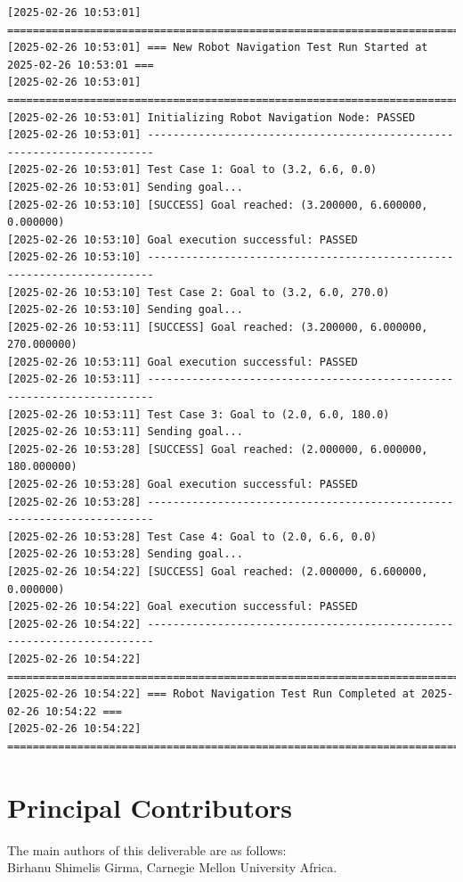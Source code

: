 \documentclass{CSSRforAfrica}
\newcommand{\blank}{~\\}
\begin{document}
\begin{landscape}
\begin{verbatim}
[2025-02-26 10:53:01] =======================================================================
[2025-02-26 10:53:01] === New Robot Navigation Test Run Started at 2025-02-26 10:53:01 ===
[2025-02-26 10:53:01] =======================================================================
[2025-02-26 10:53:01] Initializing Robot Navigation Node: PASSED
[2025-02-26 10:53:01] -----------------------------------------------------------------------
[2025-02-26 10:53:01] Test Case 1: Goal to (3.2, 6.6, 0.0)
[2025-02-26 10:53:01] Sending goal...
[2025-02-26 10:53:10] [SUCCESS] Goal reached: (3.200000, 6.600000, 0.000000)
[2025-02-26 10:53:10] Goal execution successful: PASSED
[2025-02-26 10:53:10] -----------------------------------------------------------------------
[2025-02-26 10:53:10] Test Case 2: Goal to (3.2, 6.0, 270.0)
[2025-02-26 10:53:10] Sending goal...
[2025-02-26 10:53:11] [SUCCESS] Goal reached: (3.200000, 6.000000, 270.000000)
[2025-02-26 10:53:11] Goal execution successful: PASSED
[2025-02-26 10:53:11] -----------------------------------------------------------------------
[2025-02-26 10:53:11] Test Case 3: Goal to (2.0, 6.0, 180.0)
[2025-02-26 10:53:11] Sending goal...
[2025-02-26 10:53:28] [SUCCESS] Goal reached: (2.000000, 6.000000, 180.000000)
[2025-02-26 10:53:28] Goal execution successful: PASSED
[2025-02-26 10:53:28] -----------------------------------------------------------------------
[2025-02-26 10:53:28] Test Case 4: Goal to (2.0, 6.6, 0.0)
[2025-02-26 10:53:28] Sending goal...
[2025-02-26 10:54:22] [SUCCESS] Goal reached: (2.000000, 6.600000, 0.000000)
[2025-02-26 10:54:22] Goal execution successful: PASSED
[2025-02-26 10:54:22] -----------------------------------------------------------------------
[2025-02-26 10:54:22] =======================================================================
[2025-02-26 10:54:22] === Robot Navigation Test Run Completed at 2025-02-26 10:54:22 ===
[2025-02-26 10:54:22] =======================================================================
\end{verbatim}
\end{landscape}  



\clearpage


\newpage

 

\pagebreak
\section*{Principal Contributors}
\label{contributors}
The main authors of this deliverable are as follows:
\blank
Birhanu Shimelis Girma, Carnegie Mellon University Africa.
\end{document}
